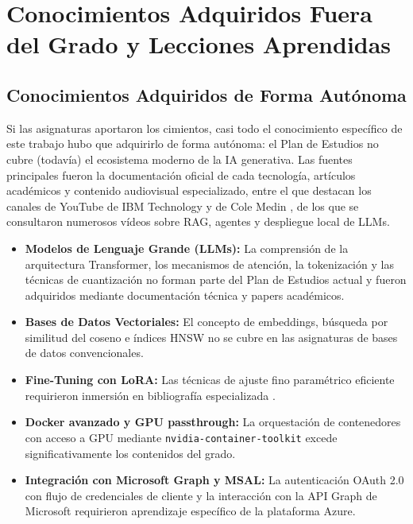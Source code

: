 \section{Conocimientos Adquiridos Fuera del Grado y Lecciones Aprendidas}
\label{sec:conocimientos-autonomos}

\subsection{Conocimientos Adquiridos de Forma Autónoma}

Si las asignaturas aportaron los cimientos, casi todo el conocimiento específico de este trabajo hubo que adquirirlo de forma autónoma: el Plan de Estudios no cubre (todavía) el ecosistema moderno de la IA generativa. Las fuentes principales fueron la documentación oficial de cada tecnología, artículos académicos y contenido audiovisual especializado, entre el que destacan los canales de YouTube de IBM Technology y de Cole Medin \cite{ibmtechnology2026youtube,colemedin2026youtube}, de los que se consultaron numerosos vídeos sobre RAG, agentes y despliegue local de LLMs.

\begin{itemize}
    \item \textbf{Modelos de Lenguaje Grande (LLMs):} La comprensión de la arquitectura Transformer, los mecanismos de atención, la tokenización y las técnicas de cuantización no forman parte del Plan de Estudios actual y fueron adquiridos mediante documentación técnica y papers académicos.

    \item \textbf{Bases de Datos Vectoriales:} El concepto de embeddings, búsqueda por similitud del coseno e índices HNSW no se cubre en las asignaturas de bases de datos convencionales.

    \item \textbf{Fine-Tuning con LoRA:} Las técnicas de ajuste fino paramétrico eficiente requirieron inmersión en bibliografía especializada \cite{hu2021lora}.

    \item \textbf{Docker avanzado y GPU passthrough:} La orquestación de contenedores con acceso a GPU mediante \texttt{nvidia-container-toolkit} excede significativamente los contenidos del grado.

    \item \textbf{Integración con Microsoft Graph y MSAL:} La autenticación OAuth 2.0 con flujo de credenciales de cliente y la interacción con la API Graph de Microsoft requirieron aprendizaje específico de la plataforma Azure.
\end{itemize}

